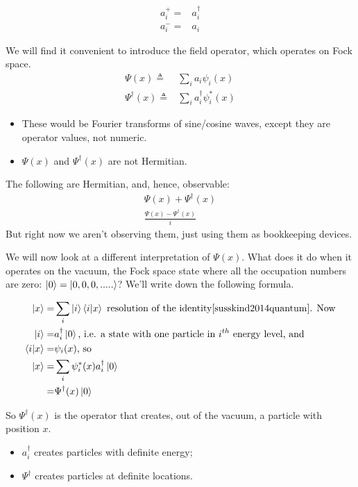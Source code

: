 \documentclass[]{article}
\begin{document}
\begin{align*}
	a^+_i =& a^\dagger_i\\
	a^-_i =& a_i
\end{align*} 

We will find it convenient to introduce the field operator, which operates on Fock space.
\begin{align*}
	\Psi(x) \triangleq & \sum_{i} a_i \psi_i(x)\\
	\Psi^\dagger(x) \triangleq& \sum_{i} a^\dagger_i \psi^*_i(x)
\end{align*}

\begin{itemize}
	\item These would be Fourier transforms of sine/cosine waves, except they are operator values, not numeric.
	\item $\Psi(x)$ and $\Psi^\dagger(x)$ are not Hermitian.
\end{itemize}

The following are Hermitian, and, hence, observable:
\begin{align*}
	\Psi(x) + \Psi^\dagger(x) \\
	\frac{\Psi(x) - \Psi^\dagger(x)}{i}
\end{align*}
But right now we aren't observing them, just using them as bookkeeping devices.

We will now look at a different interpretation of $\Psi(x)$. What does it do when it operates on the vacuum, the Fock space state where all the occupation numbers are zero: $\ket{0} = \ket{0,0,0,.....}$? We'll write down the following formula.

\begin{align*}
	\ket{x}=&\sum_{i}\ket{i}\braket{i|x}\text{ resolution of the identity\cite{susskind2014quantum}. Now}\\
	\ket{i}=&a^\dagger_i\ket{0} \text{, i.e. a state with one particle in $i^{th}$ energy level, and}\\
	\braket{i|x}=&\psi_i(x) \text{, so}\\
	\ket{x}=& \sum_i \psi^*_i(x)a^\dagger_i\ket{0}\\
	=& \Psi^\dagger(x) \ket{0}
\end{align*} 

So $\Psi^\dagger(x)$ is the operator that creates, out of the vacuum, a particle with position $x$.

\begin{itemize}
	\item $a^\dagger_i$ creates particles with definite energy;
	\item $\Psi^\dagger$ creates particles at definite locations.
\end{itemize}
\end{document}
